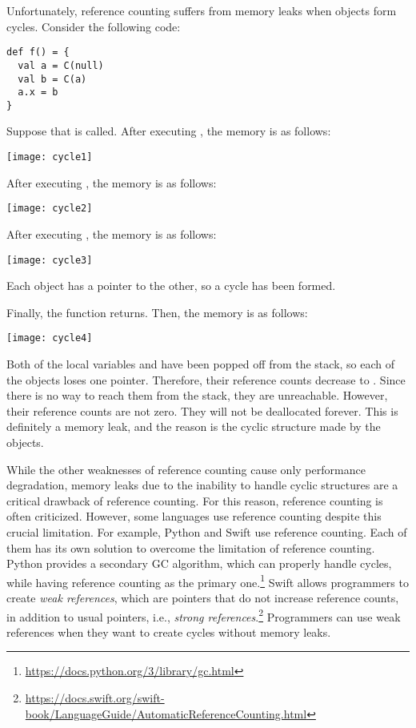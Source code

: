 Unfortunately, reference counting suffers from memory leaks when objects form
cycles. Consider the following code:

\begin{verbatim}
def f() = {
  val a = C(null)
  val b = C(a)
  a.x = b
}
\end{verbatim}

Suppose that  is called. After executing , the
memory is as follows:

\begin{center}
\texttt{[image: cycle1]}
\end{center}

After executing , the memory is as follows:

\begin{center}
\texttt{[image: cycle2]}
\end{center}

After executing , the memory is as follows:

\begin{center}
\texttt{[image: cycle3]}
\end{center}

Each object has a pointer to the other, so a cycle has been formed.

Finally, the function returns. Then, the memory is as follows:

\begin{center}
\texttt{[image: cycle4]}
\end{center}

Both of the local variables  and  have been popped off from the
stack, so each of the objects loses one pointer. Therefore, their reference
counts decrease to . Since there is no way to reach them from the stack,
they are unreachable. However, their reference counts are not zero. They will
not be deallocated forever. This is definitely a memory leak, and the reason is
the cyclic structure made by the objects.

While the other weaknesses of reference counting cause only performance
degradation, memory leaks due to the inability to handle cyclic structures are a
critical drawback of reference counting. For this reason, reference counting is
often criticized. However, some languages use reference counting despite this
crucial limitation. For example, Python and Swift use reference counting. Each
of them has its own solution to overcome the limitation of reference counting.
Python provides a secondary GC algorithm, which can properly handle cycles,
while having reference counting as the primary
one.\footnote{\url{https://docs.python.org/3/library/gc.html}} Swift allows
programmers to create \textit{weak references}, which are
pointers that do not increase reference counts, in addition to usual pointers,
i.e., \textit{strong references}.\footnote{\url{https://docs.swift.org/swift-book/LanguageGuide/AutomaticReferenceCounting.html}}
Programmers can use weak references when they want to create cycles without
memory leaks.

